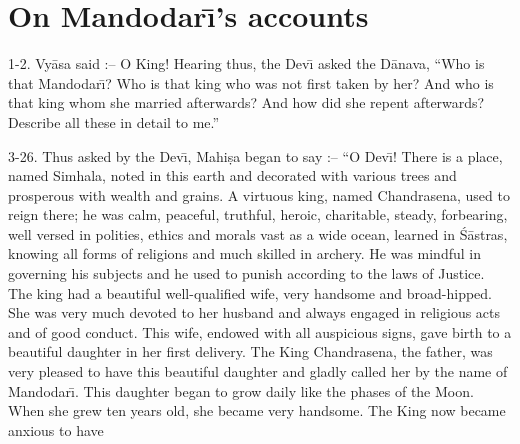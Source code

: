 \chapter{On Mandodar\={\i}'s accounts}

1-2. Vy\=asa said :-- O King! Hearing thus, the Dev\={\i} asked the D\=anava, ``Who is that Mandodar\={\i}? Who is that king who was not first taken by her? And who is that king whom she married afterwards? And how did she repent afterwards? Describe all these in detail to me.''

3-26. Thus asked by the Dev\={\i}, Mahi\d{s}a began to say :-- ``O Dev\={\i}! There is a place, named Simhala, noted in this earth and decorated with various trees and prosperous with wealth and grains. A virtuous king, named Chandrasena, used to reign there; he was calm, peaceful, truthful, heroic, charitable, steady, forbearing, well versed in polities, ethics and morals vast as a wide ocean, learned in \'S\=astras, knowing all forms of religions and much skilled in archery. He was mindful in governing his subjects and he used to punish according to the laws of Justice. The king had a beautiful well-qualified wife, very handsome and broad-hipped. She was very much devoted to her husband and always engaged in religious acts and of good conduct. This wife, endowed with all auspicious signs, gave birth to a beautiful daughter in her first delivery. The King Chandrasena, the father, was very pleased to have this beautiful daughter and gladly called her by the name of Mandodar\={\i}. This daughter began to grow daily like the phases of the Moon. When she grew ten years old, she became very handsome. The King now became anxious to have

